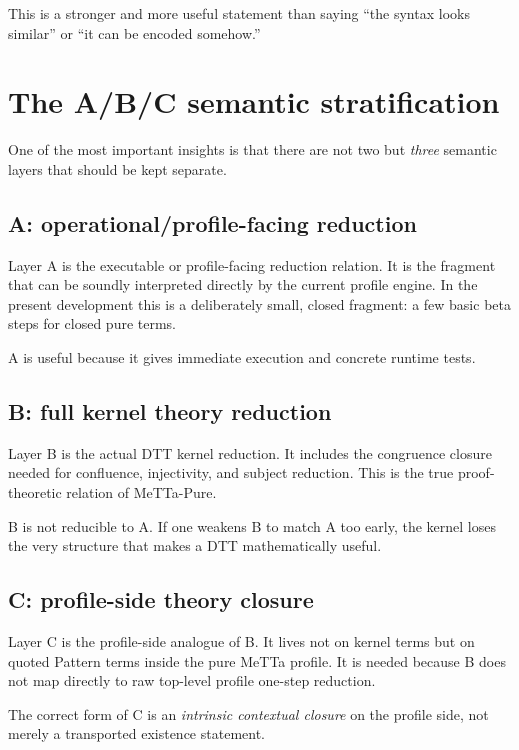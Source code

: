 \documentclass[11pt]{article}
\begin{document}
This is a stronger and more useful statement than saying ``the syntax looks similar'' or ``it can be encoded somehow.''

\section{The A/B/C semantic stratification}

One of the most important insights is that there are not two but \emph{three} semantic layers that should be kept separate.

\subsection{A: operational/profile-facing reduction}

Layer A is the executable or profile-facing reduction relation. It is the fragment that can be soundly interpreted directly by the current profile engine. In the present development this is a deliberately small, closed fragment: a few basic beta steps for closed pure terms.

A is useful because it gives immediate execution and concrete runtime tests.

\subsection{B: full kernel theory reduction}

Layer B is the actual DTT kernel reduction. It includes the congruence closure needed for confluence, injectivity, and subject reduction. This is the true proof-theoretic relation of MeTTa-Pure.

B is not reducible to A. If one weakens B to match A too early, the kernel loses the very structure that makes a DTT mathematically useful.

\subsection{C: profile-side theory closure}

Layer C is the profile-side analogue of B. It lives not on kernel terms but on quoted Pattern terms inside the pure MeTTa profile. It is needed because B does not map directly to raw top-level profile one-step reduction.

The correct form of C is an \emph{intrinsic contextual closure} on the profile side, not merely a transported existence statement.
\end{document}
